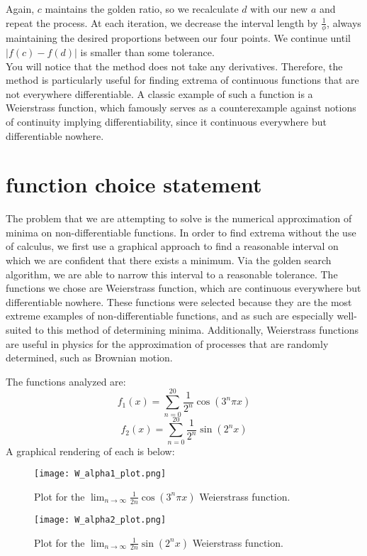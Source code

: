 \documentclass[linenumbers,RNAAS,trackchanges]{aastex631}
\begin{document}
\noindent
Again, $c$ maintains the golden ratio, so we recalculate $d$ with our new $a$ and repeat the process. At each iteration, we decrease the interval length by $\frac{1}{\phi}$, always maintaining the desired proportions between our four points. We continue until $|f(c) - f(d)|$ is smaller than some tolerance.\\

\noindent
You will notice that the method does not take any derivatives. Therefore, the method is particularly useful for finding extrema of continuous functions that are not everywhere differentiable. A classic example of such a function is a Weierstrass function, which famously serves as a counterexample against notions of continuity implying differentiability, since it continuous everywhere but differentiable nowhere.

\vspace{1cm}
\section{\textbf{function choice statement}}
The problem that we are attempting to solve is the numerical approximation of minima on non-differentiable functions. In order to find extrema without the use of calculus, we first use a graphical approach to find a reasonable interval on which we are confident that there exists a minimum. Via the golden search algorithm, we are able to narrow this interval to a reasonable tolerance. The functions we chose are Weierstrass function, which are continuous everywhere but differentiable nowhere. These functions were selected because they are the most extreme examples of non-differentiable functions, and as such are especially well-suited to this method of determining minima. Additionally, Weierstrass functions are useful in physics for the approximation of processes that are randomly determined, such as Brownian motion.

The functions analyzed are:
\begin{equation}
    f_1(x) = \sum_{n = 0}^{20}\frac{1}{2^n} \cos{(3^n \pi x)}
\end{equation}
\begin{equation}
    f_2(x) = \sum_{n = 0}^{20} \frac{1}{2^n} \sin{(2^nx)}
\end{equation}
A graphical rendering of each is below:
\begin{figure}[H]
 \centering
 \texttt{[image: W\_alpha1\_plot.png]}
 \caption
 {\protect Plot for the $\displaystyle \lim_{n \to \infty} \frac{1}{2n} \cos{(3^n \pi x)}$ Weierstrass function. 
 }
 \label{fig:apparatus}
\end{figure}
\begin{figure}[H]
 \centering
 \texttt{[image: W\_alpha2\_plot.png]}
 \caption
 {\protect Plot for the $\displaystyle \lim_{n \to \infty} \frac{1}{2n} \sin{(2^n x)}$ Weierstrass function. 
 }
 \label{fig:apparatus}
\end{figure}
\end{document}
